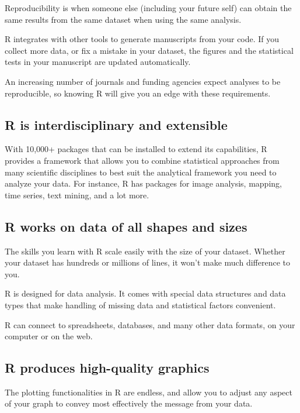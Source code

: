 \documentclass[]{book}
\theoremstyle{definition}
\theoremstyle{definition}
\theoremstyle{remark}
\begin{document}
Reproducibility is when someone else (including your future self) can
obtain the same results from the same dataset when using the same
analysis.

R integrates with other tools to generate manuscripts from your code. If
you collect more data, or fix a mistake in your dataset, the figures and
the statistical tests in your manuscript are updated automatically.

An increasing number of journals and funding agencies expect analyses to
be reproducible, so knowing R will give you an edge with these
requirements.

\subsection{R is interdisciplinary and
extensible}\label{r-is-interdisciplinary-and-extensible}

With 10,000+ packages that can be installed to extend its capabilities,
R provides a framework that allows you to combine statistical approaches
from many scientific disciplines to best suit the analytical framework
you need to analyze your data. For instance, R has packages for image
analysis, mapping, time series, text mining, and a lot more.

\subsection{R works on data of all shapes and
sizes}\label{r-works-on-data-of-all-shapes-and-sizes}

The skills you learn with R scale easily with the size of your dataset.
Whether your dataset has hundreds or millions of lines, it won't make
much difference to you.

R is designed for data analysis. It comes with special data structures
and data types that make handling of missing data and statistical
factors convenient.

R can connect to spreadsheets, databases, and many other data formats,
on your computer or on the web.

\subsection{R produces high-quality
graphics}\label{r-produces-high-quality-graphics}

The plotting functionalities in R are endless, and allow you to adjust
any aspect of your graph to convey most effectively the message from
your data.
\end{document}
